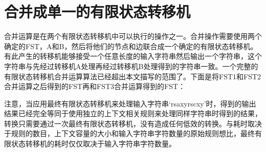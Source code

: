 
\section{合并成单一的有限状态转移机}
合并运算是在两个有限状态转移机中可以执行的操作之一。合并操作需要使用两个确定的FST，A和B，然后将他们的节点和边联合成一个确定的有限状态转移机。有此产生的转移机能够接受一个任意长度的输入字符串然后输出一个字符串，这个字符串与先经过转移机A处理再经过转移机B处理得到的字符串一致。一个完整的有限状态转移机合并运算算法已经超出本文描写的范围了。下面是将FST1和FST2合并运算之后得到的FST再和FST3合并运算得到的FST：


注意，当应用最终有限状态转移机来处理输入字符串‘rsaxyrscxy’时，得到的输出结果已经完全等同于使用独立的上下文相关规则来处理同样字符串时得到的结果，转换只需要通过一次最终有限状态转移机，没有造成任何低效的转换。与耗时取决于规则的数目，上下文容量的大小和输入字符串字符数量的原始规则想比，最终有限状态转移机的耗时仅仅取决于输入字符串字符数量。
